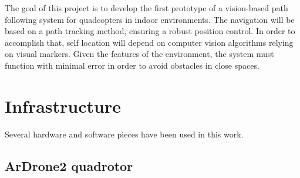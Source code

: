 \documentclass{styles/svproc}
\begin{document}
	
	The goal of this project is to develop the first prototype of a vision-based path following system for quadcopters in indoor environments. The navigation will be based on a path tracking method, ensuring a robust position control. In order to accomplish that, self location will depend on computer vision algorithms relying on visual markers. Given the features of the environment, the system must function with minimal error in order to avoid obstacles in close spaces.

\section{Infrastructure}

Several hardware and software pieces have been used in this work.

\subsection{ArDrone2 quadrotor}
\end{document}

